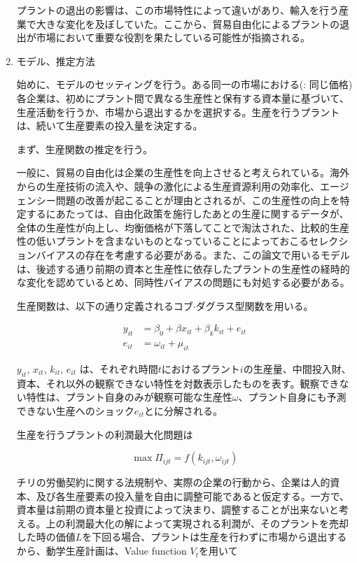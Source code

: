 \documentclass{jsarticle}
\begin{document}
\begin{enumerate}
プラントの退出の影響は、この市場特性によって違いがあり、輸入を行う産業で大きな変化を及ぼしていた。ここから、貿易自由化によるプラントの退出が市場において重要な役割を果たしている可能性が指摘される。

\item モデル、推定方法

始めに、モデルのセッティングを行う。ある同一の市場における(: 同じ価格)各企業は、初めにプラント間で異なる生産性と保有する資本量に基づいて、生産活動を行うか、市場から退出するかを選択する。生産を行うプラントは、続いて生産要素の投入量を決定する。

まず、生産関数の推定を行う。

一般に、貿易の自由化は企業の生産性を向上させると考えられている。海外からの生産技術の流入や、競争の激化による生産資源利用の効率化、エージェンシー問題の改善が起こることが理由とされるが、この生産性の向上を特定するにあたっては、自由化政策を施行したあとの生産に関するデータが、全体の生産性が向上し、均衡価格が下落してことで淘汰された、比較的生産性の低いプラントを含まないものとなっていることによっておこるセレクションバイアスの存在を考慮する必要がある。また、この論文で用いるモデルは、後述する通り前期の資本と生産性に依存したプラントの生産性の経時的な変化を認めているとめ、同時性バイアスの問題にも対処する必要がある。

生産関数は、以下の通り定義されるコブ$\cdot$ダグラス型関数を用いる。

 \begin{align*}
 y_{it} &= \beta_0 + \beta x_{it} + \beta_k k_{it} + e_{it} \\
 e_{it} &= \omega_{it} + \mu_{it}
 \end{align*}

$y_{it}$, $x_{it}$, $k_{it}$, $e_{it}$ は、それぞれ時間$t$におけるプラント$i$の生産量、中間投入財、資本、それ以外の観察できない特性を対数表示したものを表す。観察できない特性は、プラント自身のみが観察可能な生産性$\omega$、プラント自身にも予測できない生産へのショック$e_{it}$とに分解される。

生産を行うプラントの利潤最大化問題は

\[ \max \Pi_{ijt} = f(k_{ijt}, \omega_{ijt}) \]

チリの労働契約に関する法規制や、実際の企業の行動から、企業は人的資本、及び各生産要素の投入量を自由に調整可能であると仮定する。一方で、資本量は前期の資本量と投資によって決まり、調整することが出来ないと考える。上の利潤最大化の解によって実現される利潤が、そのプラントを売却した時の価値$L$を下回る場合、プラントは生産を行わずに市場から退出するから、動学生産計画は、Value function $V_t$を用いて


\end{enumerate}
\end{document}
